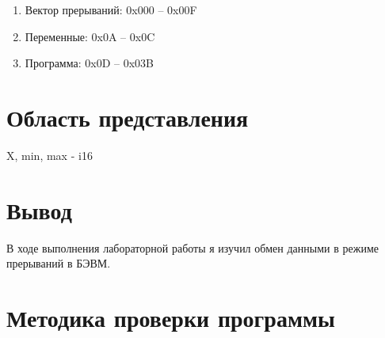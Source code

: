 \documentclass{article}
\begin{document}
\begin{enumerate}
  \item Вектор прерываний: 0x000 – 0x00F
  \item Переменные: 0x0A – 0x0C
  \item Программа: 0x0D – 0x03B
\end{enumerate}


\section{Область представления}

X, min, max - i16

\section{Вывод}

В ходе выполнения лабораторной работы я изучил обмен данными в режиме прерываний в БЭВМ.

\newpage

\section{Методика проверки программы}
\end{document}
